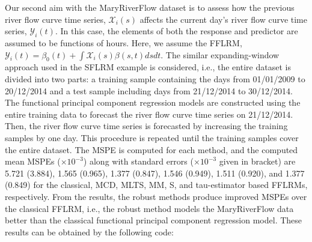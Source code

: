 Our second aim with the MaryRiverFlow dataset is to assess how the previous river flow curve time series, $\mathcal{X}_i(s)$ affects the current day's river flow curve time series, $\mathcal{Y}_i(t)$. In this case, the elements of both the response and predictor are assumed to be functions of hours. Here, we assume the FFLRM, $\mathcal{Y}_i(t) = \beta_0(t) + \int \mathcal{X}_i(s) \beta(s,t) ds dt$. The similar expanding-window approach used in the SFLRM example is considered, i.e., the entire dataset is divided into two parts: a training sample containing the days from 01/01/2009 to 20/12/2014 and a test sample including days from 21/12/2014 to 30/12/2014. The functional principal component regression models are constructed using the entire training data to forecast the river flow curve time series on 21/12/2014. Then, the river flow curve time series is forecasted by increasing the training samples by one day. This procedure is repeated until the training samples cover the entire dataset. The MSPE is computed for each method, and the computed mean MSPEs ($\times 10^{-3}$) along with standard errors ($\times 10^{-3}$ given in bracket) are 5.721 (3.884), 1.565 (0.965), 1.377 (0.847), 1.546 (0.949), 1.511 (0.920), and 1.377 (0.849) for the classical, MCD, MLTS, MM, S, and tau-estimator based FFLRMs, respectively. From the results, the robust methods produce improved MSPEs over the classical FFLRM, i.e., the robust method models the MaryRiverFlow data better than the classical functional principal component regression model. These results can be obtained by the following code:

